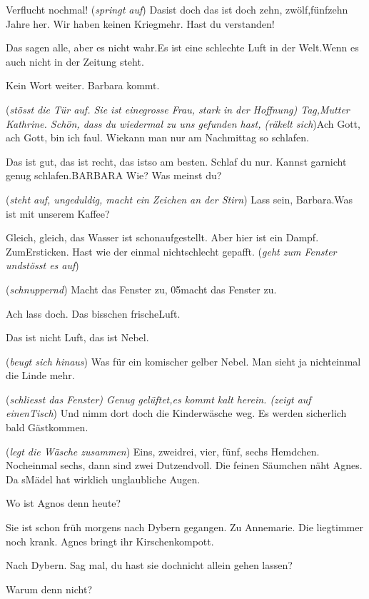 \documentclass[
	final,
	a4paper,
	ngerman,
	mpinclude = true, %
	twoside = true,
	open = right,
	cleardoublepage = plain,
	DIV = 13,
	BCOR = 1cm,
	titlepage = firstiscover,
	]{scrbook}
\newcommand{\direction}[1]{(\textit{#1})}
\newcommand{\thecharacter}[1]{\textup{\textsc{#1}}\xspace}
\newcommand{\theBarbara}{\thecharacter{Barbara}}
\newcommand{\theJosef}{\thecharacter{Josef}}
\newcommand{\theKathrine}{\thecharacter{Kathrine}}
\newcommand{\character}[1]{\item[#1]}
\newcommand{\Barbara}{\character{\theBarbara}}
\newcommand{\Josef}{\character{\theJosef}}
\newcommand{\Kathrine}{\character{\theKathrine}}
\begin{document}
\begin{play}
\Josef
Verflucht nochmal! \direction{springt auf} Dasist doch das ist doch zehn, zwölf,fünfzehn Jahre her. Wir haben keinen Kriegmehr. Hast du verstanden!

\Kathrine
Das sagen alle, aber es nicht wahr.Es ist eine schlechte Luft in der Welt.Wenn es auch nicht in der Zeitung steht.

\Josef
Kein Wort weiter. Barbara kommt.

\Barbara
\direction{stösst die Tür auf. Sie ist einegrosse Frau, stark in der Hoffnung) Tag,Mutter Kathrine. Schön, dass du wiedermal zu uns gefunden hast, (räkelt sich}Ach Gott, ach Gott, bin ich faul. Wiekann man nur am Nachmittag so schlafen.

\Kathrine
Das ist gut, das ist recht, das istso am besten. Schlaf du nur. Kannst garnicht genug schlafen.BARBARA Wie? Was meinst du?

\Josef
\direction{steht auf, ungeduldig, macht ein Zeichen an der Stirn} Lass sein, Barbara.Was ist mit unserem Kaffee?

\Barbara
Gleich, gleich, das Wasser ist schonaufgestellt. Aber hier ist ein Dampf. ZumErsticken. Hast wie der einmal nichtschlecht gepafft. \direction{geht zum Fenster undstösst es auf}

\Kathrine
\direction{schnuppernd} Macht das Fenster zu, 05macht das Fenster zu.

\Barbara
Ach lass doch. Das bisschen frischeLuft.

\Kathrine
Das ist nicht Luft, das ist Nebel.

\Barbara
\direction{beugt sich hinaus} Was für ein komischer gelber Nebel. Man sieht ja nichteinmal die Linde mehr.

\Josef
\direction{schliesst das Fenster) Genug gelüftet,es kommt kalt herein. (zeigt auf einenTisch} Und nimm dort doch die Kinderwäsche weg. Es werden sicherlich bald Gästkommen.

\Barbara
\direction{legt die Wäsche zusammen} Eins, zweidrei, vier, fünf, sechs Hemdchen. Nocheinmal sechs, dann sind zwei Dutzendvoll. Die feinen Säumchen näht Agnes. Da sMädel hat wirklich unglaubliche Augen.

\Josef
Wo ist Agnos denn heute?

\Barbara
Sie ist schon früh morgens nach Dybern gegangen. Zu Annemarie. Die liegtimmer noch krank. Agnes bringt ihr Kirschenkompott.

\Josef
Nach Dybern. Sag mal, du hast sie dochnicht allein gehen lassen?

\Barbara
Warum denn nicht?


\end{play}
\end{document}
